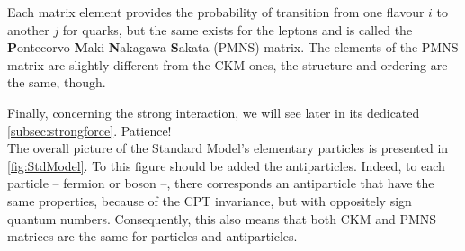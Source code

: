 Each matrix element provides the probability of transition from one flavour $i$ to another $j$ for quarks, but the same exists for the leptons and is called the \textbf{P}ontecorvo-\textbf{M}aki-\textbf{N}akagawa-\textbf{S}akata (PMNS) matrix. The elements of the PMNS matrix are slightly different from the CKM ones, the structure and ordering are the same, though. 

Finally, concerning the strong interaction, we will see later in its dedicated \Sec\ref{subsec:strongforce}. Patience!
\\


The overall picture of the Standard Model's elementary particles is presented in \fig\ref{fig:StdModel}. To this figure should be added the antiparticles. Indeed, to each particle -- fermion or boson --, there corresponds an antiparticle that have the same properties, because of the CPT invariance, but with oppositely sign quantum numbers. Consequently, this also means that both CKM and PMNS matrices are the same for particles and antiparticles.

